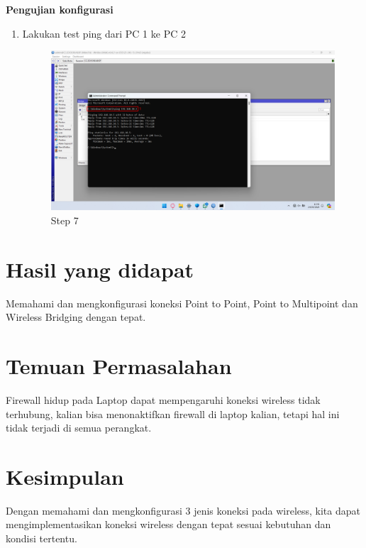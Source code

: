 \begin{center}
	\textbf{Pengujian konfigurasi}
	\begin{enumerate}
		\item Lakukan test ping dari PC 1 ke PC 2
		      \begin{figure}[H]
			      \centering
			      \includegraphics[width=0.9\linewidth]{P1/img/per3/pc1/Step 7.png}
			      \caption{Step 7}
			      \label{fig:Step 7(Per.3 PC1)}
		      \end{figure}
	\end{enumerate}

\end{center}

\section{Hasil yang didapat}
Memahami dan mengkonfigurasi koneksi Point to Point, Point to Multipoint dan Wireless
Bridging dengan tepat.

\section{Temuan Permasalahan}
Firewall hidup pada Laptop dapat mempengaruhi koneksi wireless tidak terhubung, kalian
bisa menonaktifkan firewall di laptop kalian, tetapi hal ini tidak terjadi di semua perangkat.

\section{Kesimpulan}
Dengan memahami dan mengkonfigurasi 3 jenis koneksi pada wireless, kita dapat
mengimplementasikan koneksi wireless dengan tepat sesuai kebutuhan dan kondisi tertentu.
